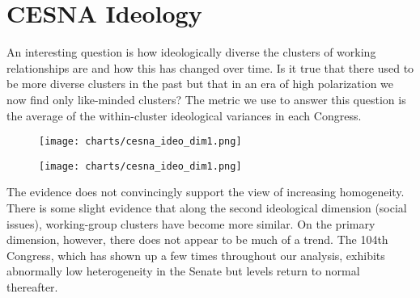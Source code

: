 \section{CESNA Ideology}

An interesting question is how ideologically diverse the clusters of working relationships are and how this has changed over time. Is it true that there used to be more diverse clusters in the past but that in an era of high polarization we now find only like-minded clusters? The metric we use to answer this question is the average of the within-cluster ideological variances in each Congress.

\begin{figure}[htbp]
  \centering
  \begin{minipage}[h]{0.4\textwidth}
    \texttt{[image: charts/cesna\_ideo\_dim1.png]}
  \end{minipage}
  \hfill
  \begin{minipage}[h]{0.4\textwidth}
    \texttt{[image: charts/cesna\_ideo\_dim1.png]}
  \end{minipage}
\end{figure}

The evidence does not convincingly support the view of increasing homogeneity. There is some slight evidence that along the second ideological dimension (social issues), working-group clusters have become more similar. On the primary dimension, however, there does not appear to be much of a trend. The 104th Congress, which has shown up a few times throughout our analysis, exhibits abnormally low heterogeneity in the Senate but levels return to normal thereafter. 